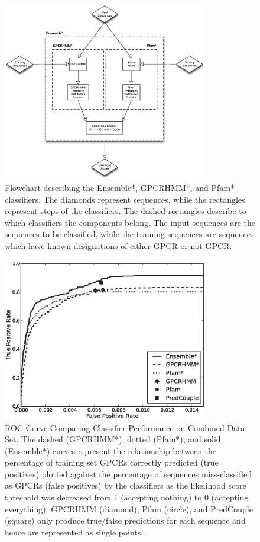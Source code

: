 \begin{figure}[H]
\centering
\includegraphics[width=0.8\textwidth]{figures/gpcr_classifier/ensemble-diagram.eps}
\caption{Flowchart describing the Ensemble*, GPCRHMM*, and Pfam* classifiers.  The diamonds represent sequences, while the rectangles represent steps of the classifiers.  The dashed rectangles describe to which classifiers the components belong. The input sequences are the sequences to be classified, while the training sequences are sequences which have known designations of either GPCR or not GPCR.}
\label{fig:ensemble-diagram}
\end{figure}

\begin{figure}[H]
\centering
\includegraphics[width=0.8\textwidth]{figures/gpcr_classifier/combined_ensembl_roc.eps}
\caption{ROC Curve Comparing Classifier Performance on Combined Data Set. The dashed (GPCRHMM*), dotted (Pfam*), and solid (Ensemble*) curves represent the relationship between the percentage of training set GPCRs correctly predicted (true positives) plotted against the percentage of sequences miss-classified as GPCRs (false positives) by the classifiers as the likelihood score threshold was decreased from 1 (accepting nothing) to 0 (accepting everything). GPCRHMM (diamond), Pfam (circle), and PredCouple (square) only produce true/false predictions for each sequence and hence are represented as single points. }
\label{fig:combined-roc-curve}
\end{figure}

